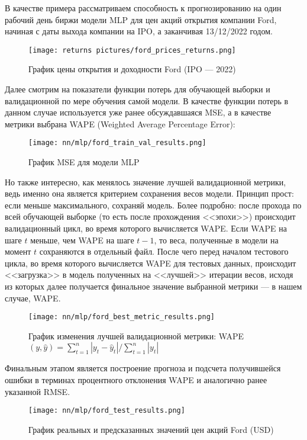 В качестве примера рассматриваем способность к прогнозированию на один рабочий день биржи модели MLP для цен акций открытия компании Ford, начиная с даты выхода компании на IPO, а заканчивая 13/12/2022 годом.
\begin{figure}[H]
	\centering
	\texttt{[image: returns pictures/ford\_prices\_returns.png]}
	\caption{График цены открытия и доходности Ford (IPO --- 2022)}
	\label{fig::ford_prices_returns}
\end{figure}
Далее смотрим на показатели функции потерь для обучающей выборки и валидационной по мере обучения самой модели. В качестве функции потерь в данном случае используется уже ранее обсуждавшаяся MSE, а в качестве метрики выбрана WAPE (Weighted Average Percentage Error):
\begin{figure}[H]
	\centering
	\texttt{[image: nn/mlp/ford\_train\_val\_results.png]}
	\caption{График MSE для модели MLP}
	\label{fig::ford_train_val_results}
\end{figure}
Но также интересно, как менялось значение лучшей валидационной метрики, ведь именно она является критерием сохранения весов модели. Принцип прост: если меньше максимального, сохраняй модель. Более подробно: после прохода по всей обучающей выборке (то есть после прохождения <<эпохи>>) происходит валидационный цикл, во время которого вычисляется WAPE. Если WAPE на шаге $t$ меньше, чем WAPE на шаге $t - 1$, то веса, полученные в модели на момент $t$ сохраняются в отдельный файл. После чего перед началом тестового цикла, во время которого вычисляется WAPE для тестовых данных, происходит <<загрузка>> в модель полученных на <<лучшей>> итерации весов, исходя из которых далее получается финальное значение выбранной метрики --- в нашем случае, WAPE.
\begin{figure}[H]
	\centering
	\texttt{[image: nn/mlp/ford\_best\_metric\_results.png]}
	\caption{График изменения лучшей валидационной метрики: WAPE$(y, \hat{y}) = \sum_{t = 1}^n |y_t - \hat{y}_t| / \sum_{t = 1}^n |y_t|$}
	\label{fig::ford_train_best_metric_results}
\end{figure}
Финальным этапом является построение прогноза и подсчета получившейся ошибки в терминах процентного отклонения WAPE и аналогично ранее указанной RMSE.
\begin{figure}[H]
	\centering
	\texttt{[image: nn/mlp/ford\_test\_results.png]}
	\caption{График реальных и предсказанных значений цен акций Ford (USD)}
	\label{fig::ford_test_results}
\end{figure}
